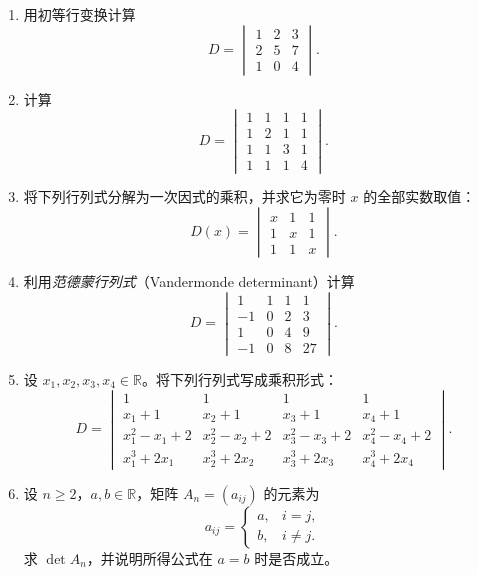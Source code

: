 \documentclass[UTF8,12pt,a4paper,fontset=fandol]{ctexart}
\begin{document}
\begin{enumerate}[label=\arabic*.,resume=detquestions]

\item\label{q:numeric-three}
用初等行变换计算
\[
D=\begin{vmatrix}1&2&3\\2&5&7\\1&0&4\end{vmatrix}.
\]

\item\label{q:numeric-four}
计算
\[
D=\begin{vmatrix}
1&1&1&1\\1&2&1&1\\1&1&3&1\\1&1&1&4
\end{vmatrix}.
\]

\item\label{q:parameter-three}
将下列行列式分解为一次因式的乘积，并求它为零时 $x$ 的全部实数取值：
\[
D(x)=\begin{vmatrix}x&1&1\\1&x&1\\1&1&x\end{vmatrix}.
\]

\item\label{q:vandermonde-numeric}
利用\emph{范德蒙行列式}（Vandermonde determinant）计算
\[
D=\begin{vmatrix}
1&1&1&1\\-1&0&2&3\\1&0&4&9\\-1&0&8&27
\end{vmatrix}.
\]

\item\label{q:polynomial-four}
设 $x_1,x_2,x_3,x_4\in\mathbb R$。将下列行列式写成乘积形式：
\[
D=\begin{vmatrix}
1&1&1&1\\
x_1+1&x_2+1&x_3+1&x_4+1\\
x_1^2-x_1+2&x_2^2-x_2+2&x_3^2-x_3+2&x_4^2-x_4+2\\
x_1^3+2x_1&x_2^3+2x_2&x_3^3+2x_3&x_4^3+2x_4
\end{vmatrix}.
\]

\item\label{q:constant-off-diagonal}
设 $n\geq2$，$a,b\in\mathbb R$，矩阵 $A_n=(a_{ij})$ 的元素为
\[
a_{ij}=\begin{cases}a,&i=j,\\b,&i\ne j.\end{cases}
\]
求 $\det A_n$，并说明所得公式在 $a=b$ 时是否成立。


\end{enumerate}
\end{document}
